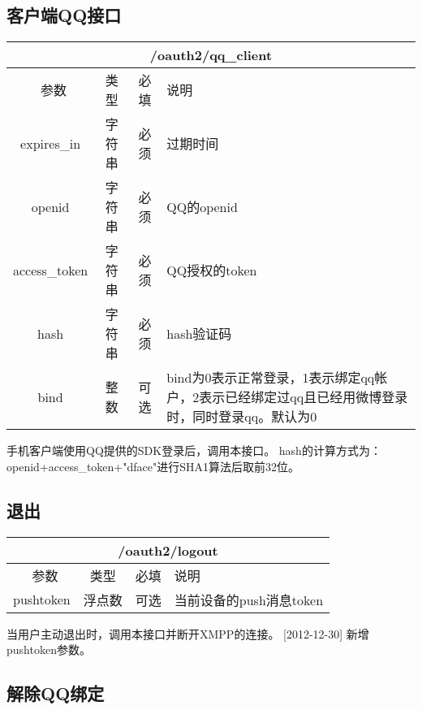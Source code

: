 \subsection{客户端QQ接口}
\label{hash_algorithm}

\begin{table}[H]
   \begin{center}
\begin{tabular}{|c|c|c|p{12cm}|}
\hline
\multicolumn{4}{|c|}{/oauth2/qq\_client} \\
\hline\hline
 \  参数  & 类型 & 必填 &  说明  \\
 \hline
 expires\_in  & 字符串 & 必须 &  过期时间\\
  \hline
 openid  & 字符串 & 必须 &  QQ的openid\\
  \hline
 access\_token  & 字符串 & 必须 &  QQ授权的token\\
 \hline
 hash  & 字符串 & 必须 &  hash验证码\\
 \hline
 bind  & 整数 & 可选 &  bind为0表示正常登录，1表示绑定qq帐户，2表示已经绑定过qq且已经用微博登录时，同时登录qq。默认为0\\

\hline
\end{tabular}
   \end{center}
\end{table}
手机客户端使用QQ提供的SDK登录后，调用本接口。
hash的计算方式为：openid+access\_token+"dface"进行SHA1算法后取前32位。


\subsection{退出}

\begin{table}[H]
   \begin{center}
\begin{tabular}{|c|c|c|p{12cm}|}
\hline
\multicolumn{4}{|c|}{/oauth2/logout} \\
\hline\hline
 \  参数  & 类型 & 必填 &  说明  \\
\hline
    pushtoken  & 浮点数 & 可选 &  当前设备的push消息token\\
\hline
\end{tabular}
   \end{center}
\end{table}

当用户主动退出时，调用本接口并断开XMPP的连接。
[2012-12-30] 新增pushtoken参数。


\subsection{解除QQ绑定}

